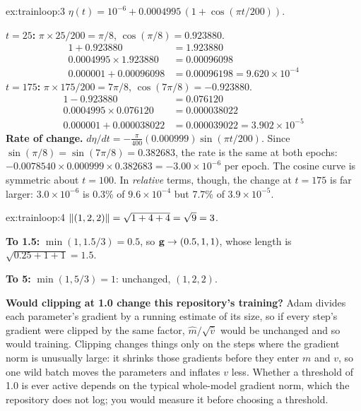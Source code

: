 \begin{solution}{ex:trainloop:3}
$\eta(t) = 10^{-6} + 0.0004995\,(1 + \cos(\pi t/200))$.

\textbf{$t = 25$:} $\pi \times 25/200 = \pi/8$, $\cos(\pi/8) = 0.923880$.
\begin{align*}
1 + 0.923880 &= 1.923880\\
0.0004995 \times 1.923880 &= 0.00096098\\
0.000001 + 0.00096098 &= 0.00096198 = 9.620 \times 10^{-4}
\end{align*}
\textbf{$t = 175$:} $\pi \times 175/200 = 7\pi/8$, $\cos(7\pi/8) = -0.923880$.
\begin{align*}
1 - 0.923880 &= 0.076120\\
0.0004995 \times 0.076120 &= 0.000038022\\
0.000001 + 0.000038022 &= 0.000039022 = 3.902 \times 10^{-5}
\end{align*}
\textbf{Rate of change.} $d\eta/dt = -\frac{\pi}{400}(0.000999)\sin(\pi t/200)$. Since $\sin(\pi/8) =
\sin(7\pi/8) = 0.382683$, the rate is the same at both epochs: $-0.0078540 \times 0.000999
\times 0.382683 = -3.00 \times 10^{-6}$ per epoch. The cosine curve is symmetric about $t = 100$.
In \emph{relative} terms, though, the change at $t = 175$ is far larger: $3.0 \times 10^{-6}$ is
0.3\% of $9.6 \times 10^{-4}$ but 7.7\% of $3.9 \times 10^{-5}$.
\end{solution}

\begin{solution}{ex:trainloop:4}
$\left\lVert (1, 2, 2) \right\rVert = \sqrt{1 + 4 + 4} = \sqrt{9} = 3$.

\textbf{To 1.5:} $\min(1, 1.5/3) = 0.5$, so $\mathbf{g} \to (0.5, 1, 1)$, whose length is
$\sqrt{0.25 + 1 + 1} = 1.5$.

\textbf{To 5:} $\min(1, 5/3) = 1$: unchanged, $(1, 2, 2)$.

\textbf{Would clipping at 1.0 change this repository's training?} Adam divides each parameter's
gradient by a running estimate of its size, so if every step's gradient were clipped by the same
factor, $\hat{m}/\sqrt{\hat{v}}$ would be unchanged and so would training. Clipping changes
things only on the steps where the gradient norm is unusually large: it shrinks those gradients
before they enter $m$ and $v$, so one wild batch moves the parameters and inflates $v$ less.
Whether a threshold of 1.0 is ever active depends on the typical whole-model gradient norm,
which the repository does not log; you would measure it before choosing a threshold.
\end{solution}

